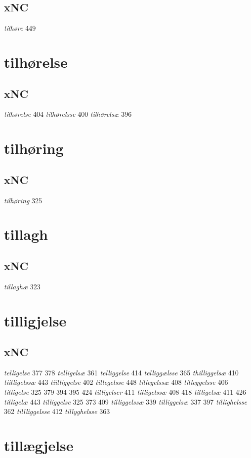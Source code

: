 \documentclass[a4paper,twocolumn]{article}
\begin{document}
\subsection{xNC}
\label{sec:org1a1ca20}
\emph{tilhøre} 449 
\section{tilhørelse}
\label{sec:orgc19b1db}
\subsection{xNC}
\label{sec:org27276f2}
\emph{tilhørelse} 404 \emph{tilhørelsse} 400 \emph{tilhørelsæ} 396 
\section{tilhøring}
\label{sec:org34b9cbb}
\subsection{xNC}
\label{sec:org5c5a4f0}
\emph{tilhøring} 325 
\section{tillagh}
\label{sec:org0506dc3}
\subsection{xNC}
\label{sec:orga965928}
\emph{tillaghæ} 323 
\section{tilligjelse}
\label{sec:org121f9e9}
\subsection{xNC}
\label{sec:org70eff48}
\emph{telligelse} 377 378 \emph{telligelsæ} 361 \emph{telliggelse} 414 \emph{telliggælsse} 365 \emph{thilliggelsæ} 410 \emph{tiilligelssæ} 443 \emph{tiilliggelse} 402 \emph{tillegelsse} 448 \emph{tillegelssæ} 408 \emph{tilleggelsse} 406 \emph{tilligelse} 325 379 394 395 424 \emph{tilligelser} 411 \emph{tilligelssæ} 408 418 \emph{tilligelsæ} 411 426 \emph{tilligelæ} 443 \emph{tilliggelse} 325 373 409 \emph{tilliggelssæ} 339 \emph{tilliggelsæ} 337 397 \emph{tillighelsse} 362 \emph{tillliggelsse} 412 \emph{tillyghelsse} 363 
\section{tillægjelse}
\label{sec:orgd5a28e2}
\end{document}
